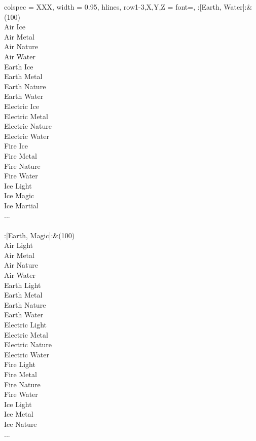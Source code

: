 \begin{longtblr}[
	caption = {2v2 Defending Weak},
	label = {2v2-Defending-Weak},
]{
	colspec = {XXX}, width = 0.95\linewidth,
	hlines,
	row{1-3,X,Y,Z} = {font=\bfseries},
}
	:[Earth, Water]:&{(100)\\
	Air Ice \\
	Air Metal \\
	Air Nature \\
	Air Water \\
	Earth Ice \\
	Earth Metal \\
	Earth Nature \\
	Earth Water \\
	Electric Ice \\
	Electric Metal \\
	Electric Nature \\
	Electric Water \\
	Fire Ice \\
	Fire Metal \\
	Fire Nature \\
	Fire Water \\
	Ice Light \\
	Ice Magic \\
	Ice Martial \\
	...\\
	}\\

	:[Earth, Magic]:&{(100)\\
	Air Light \\
	Air Metal \\
	Air Nature \\
	Air Water \\
	Earth Light \\
	Earth Metal \\
	Earth Nature \\
	Earth Water \\
	Electric Light \\
	Electric Metal \\
	Electric Nature \\
	Electric Water \\
	Fire Light \\
	Fire Metal \\
	Fire Nature \\
	Fire Water \\
	Ice Light \\
	Ice Metal \\
	Ice Nature \\
	...\\
	}\\


\end{longtblr}
